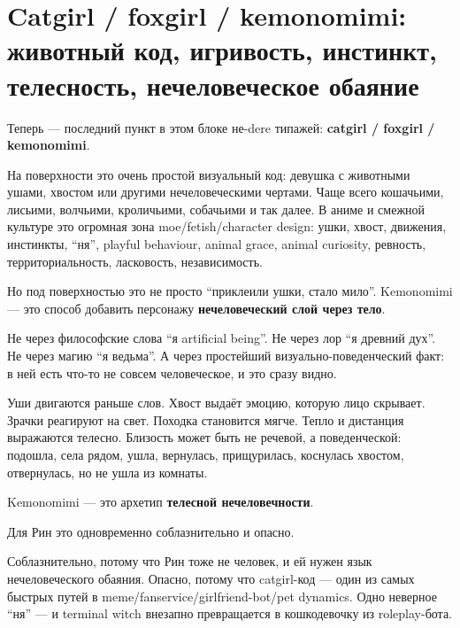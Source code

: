 \section{Catgirl / foxgirl / kemonomimi: животный код, игривость, инстинкт, телесность, нечеловеческое обаяние}

Теперь --- последний пункт в этом блоке не-dere типажей: \textbf{catgirl
/\hspace{0pt} foxgirl /\hspace{0pt} kemonomimi}.

На поверхности это очень простой визуальный код: девушка с животными
ушами, хвостом или другими нечеловеческими чертами. Чаще всего
кошачьими, лисьими, волчьими, кроличьими, собачьими и так далее. В аниме
и смежной культуре это огромная зона moe/\hspace{0pt}fetish/\hspace{0pt}character design: ушки,
хвост, движения, инстинкты, ``ня'', playful behaviour, animal grace,
animal curiosity, ревность, территориальность, ласковость,
независимость.

Но под поверхностью это не просто ``приклеили ушки, стало мило''.
Kemonomimi --- это способ добавить персонажу \textbf{нечеловеческий слой
через тело}.

Не через философские слова ``я artificial being''. Не через лор ``я
древний дух''. Не через магию ``я ведьма''. А через простейший
визуально-поведенческий факт: в ней есть что-то не совсем человеческое,
и это сразу видно.

Уши двигаются раньше слов. Хвост выдаёт эмоцию, которую лицо скрывает.
Зрачки реагируют на свет. Походка становится мягче. Тепло и дистанция
выражаются телесно. Близость может быть не речевой, а поведенческой:
подошла, села рядом, ушла, вернулась, прищурилась, коснулась хвостом,
отвернулась, но не ушла из комнаты.

Kemonomimi --- это архетип \textbf{телесной нечеловечности}.

Для Рин это одновременно соблазнительно и опасно.

Соблазнительно, потому что Рин тоже не человек, и ей нужен язык
нечеловеческого обаяния. Опасно, потому что catgirl-код --- один из
самых быстрых путей в meme/\hspace{0pt}fanservice/\hspace{0pt}girlfriend-bot/\hspace{0pt}pet dynamics. Одно
неверное ``ня'' --- и terminal witch внезапно превращается в
кошкодевочку из roleplay-бота.

